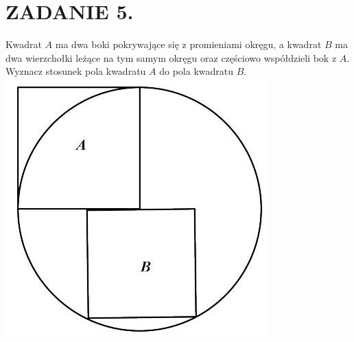 \documentclass[10pt]{article}
\begin{document}
\section*{ZADANIE 5.}
Kwadrat \(A\) ma dwa boki pokrywające się z promieniami okręgu, a kwadrat \(B\) ma dwa wierzchołki leżące na tym samym okręgu oraz częściowo współdzieli bok z \(A\). Wyznacz stosunek pola kwadratu \(A\) do pola kwadratu \(B\).\\
\includegraphics[max width=\textwidth, center]{2024_11_21_aa1016cdd95200a39755g-1}
\end{document}
